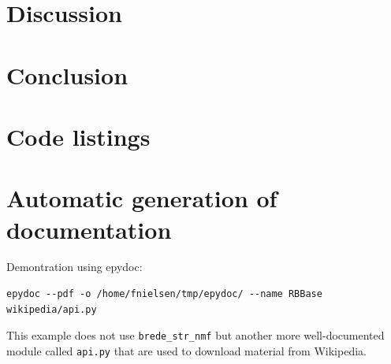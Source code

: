 \documentclass[10pt]{IEEEtran}
\begin{document}
\section{Discussion}


\section{Conclusion}






\clearpage
\onecolumn
\appendices
\section{Code listings}

\lstlistoflistings

\label{listing:PBA}

\label{listing:Untappd}

\label{listing:keywordExtractor}

\label{listing:keywordClassifier}

\label{listing:dataPoints}

\label{listing:PBAMap}

\label{listing:labels}

\label{listing:fileReader}

\label{listing:dataQuantity}


\newpage
\section{Automatic generation of documentation}

Demontration using epydoc:
\begin{verbatim}
epydoc --pdf -o /home/fnielsen/tmp/epydoc/ --name RBBase wikipedia/api.py
\end{verbatim}
This example does not use \verb!brede_str_nmf! but another more
well-documented module called {\tt api.py} that are used to download
material from Wikipedia. 

%
\end{document}
